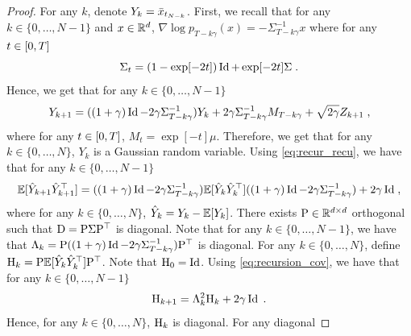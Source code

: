 \begin{proof}
  For any $k$, denote $Y_k = \bar{x}_{t_{N-k}}$.
  First, we recall that for any $k \in \{0, \dots, N-1\}$ and $x \in \mathbb{R}^d$,
  $\nabla \log p_{T-k\gamma}(x) = -\Sigma_{T-k\gamma}^{-1} x$ where for any $t \in \left[0,T\right]$
    \begin{equation}
      \Sigma_t = (1 - \exp[-2t]) \operatorname{Id} + \exp[-2t] \Sigma \; . 
    \end{equation}
Hence, we get that for any $k \in \{0, \dots, N-1\}$
\begin{equation}
  \label{eq:recur_recu}
  Y_{k+1} = ((1 + \gamma) \operatorname{Id} - 2\gamma \Sigma_{T - k \gamma}^{-1}) Y_k  + 2 \gamma \Sigma_{T - k \gamma}^{-1} M_{T-k \gamma}+ \sqrt{2 \gamma} Z_{k+1} \; ,
\end{equation}
where for any $t \in \left[0,T\right]$, $M_{t} = \exp[-t] \mu$. Therefore, we get
that for any $k \in \{0, \dots, N\}$, $Y_k$ is a Gaussian random variable.  %
Using \eqref{eq:recur_recu}, we have that for any
$k \in \{0, \dots, N-1\}$
\begin{equation}
  \label{eq:recursion_cov}
  \mathbb{E} [ \hat{Y}_{k+1} \hat{Y}_{k+1}^\top ] = ((1 + \gamma) \operatorname{Id} - 2\gamma \Sigma_{T - k \gamma}^{-1}) \mathbb{E} [ \hat{Y}_{k} \hat{Y}_{k}^\top ] ((1 + \gamma) \operatorname{Id} - 2\gamma \Sigma_{T - k \gamma}^{-1}) + 2 \gamma \operatorname{Id} \; ,
\end{equation}
where for any $k \in \{0, \dots, N\}$, $\hat{Y}_k = Y_k - \mathbb{E} [ Y_k ]$.
There exists $\mathrm{P} \in \mathbb{R}^{d \times d}$ orthogonal such that
$\mathrm{D} = \mathrm{P} \Sigma \mathrm{P}^\top$ is diagonal. Note that for any
$k \in \{0, \dots, N-1\}$, we have that
$\Lambda_k = \mathrm{P} ((1+ \gamma) \operatorname{Id} - 2 \gamma \Sigma_{T-k\gamma}^{-1})
\mathrm{P}^\top$ is diagonal. For any $k \in \{0, \dots, N\}$, define
$\mathrm{H}_k = \mathrm{P} \mathbb{E} [ \hat{Y}_{k} \hat{Y}_{k}^\top ] \mathrm{P}^\top$. Note that
$\mathrm{H}_0 = \operatorname{Id}$.  Using \eqref{eq:recursion_cov}, we have that for any
$k \in \{0, \dots, N-1\}$
\begin{equation}
  \label{eq:recursion_cov_cov}
  \mathrm{H}_{k+1} = \Lambda_k^2 \mathrm{H}_k + 2 \gamma \operatorname{Id} \; . 
\end{equation}
Hence, for any $k \in \{0, \dots, N\}$, $\mathrm{H}_k$ is diagonal. For any diagonal

\end{proof}
